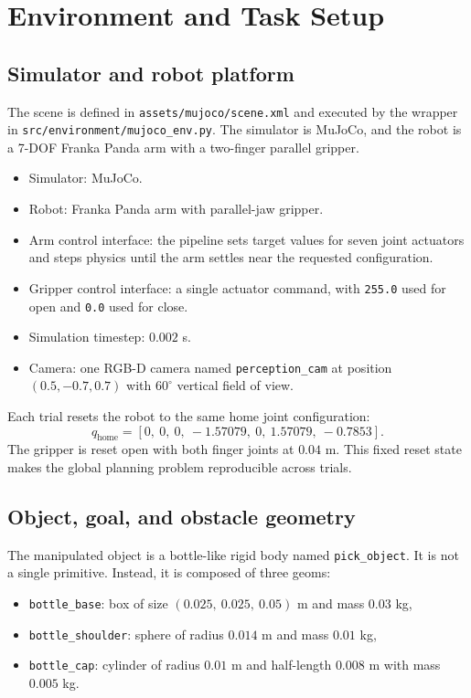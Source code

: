 \documentclass[11pt]{article}
\begin{document}
\section{Environment and Task Setup}

\subsection{Simulator and robot platform}

The scene is defined in \texttt{assets/mujoco/scene.xml} and executed by the wrapper in \texttt{src/environment/mujoco\_env.py}. The simulator is MuJoCo, and the robot is a 7-DOF Franka Panda arm with a two-finger parallel gripper.

\begin{itemize}[leftmargin=*]
    \item Simulator: MuJoCo.
    \item Robot: Franka Panda arm with parallel-jaw gripper.
    \item Arm control interface: the pipeline sets target values for seven joint actuators and steps physics until the arm settles near the requested configuration.
    \item Gripper control interface: a single actuator command, with \texttt{255.0} used for open and \texttt{0.0} used for close.
    \item Simulation timestep: \(0.002\) s.
    \item Camera: one RGB-D camera named \texttt{perception\_cam} at position \((0.5, -0.7, 0.7)\) with \(60^\circ\) vertical field of view.
\end{itemize}

Each trial resets the robot to the same home joint configuration:
\[
q_{\text{home}} =
[0,\ 0,\ 0,\ -1.57079,\ 0,\ 1.57079,\ -0.7853].
\]
The gripper is reset open with both finger joints at \(0.04\) m. This fixed reset state makes the global planning problem reproducible across trials.

\subsection{Object, goal, and obstacle geometry}

The manipulated object is a bottle-like rigid body named \texttt{pick\_object}. It is not a single primitive. Instead, it is composed of three geoms:
\begin{itemize}[leftmargin=*]
    \item \texttt{bottle\_base}: box of size \((0.025,\ 0.025,\ 0.05)\) m and mass \(0.03\) kg,
    \item \texttt{bottle\_shoulder}: sphere of radius \(0.014\) m and mass \(0.01\) kg,
    \item \texttt{bottle\_cap}: cylinder of radius \(0.01\) m and half-length \(0.008\) m with mass \(0.005\) kg.
\end{itemize}
\end{document}
